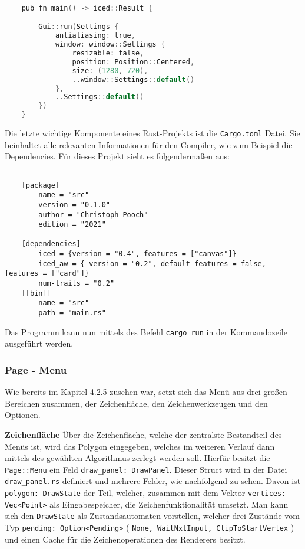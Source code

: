 \begin{lstlisting}[language=C]
  
    pub fn main() -> iced::Result {

        Gui::run(Settings {
            antialiasing: true,
            window: window::Settings {
                resizable: false,
                position: Position::Centered,
                size: (1280, 720),
                ..window::Settings::default()
            },
            ..Settings::default()
        })
    }

\end{lstlisting}

Die letzte wichtige Komponente eines Rust-Projekts ist die \lstinline{Cargo.toml} Datei. Sie beinhaltet alle relevanten Informationen für den Compiler, wie zum Beispiel die 
Dependencies. Für dieses Projekt sieht es folgendermaßen aus:

\begin{lstlisting}
  
    [package]
        name = "src"
        version = "0.1.0"
        author = "Christoph Pooch"
        edition = "2021"

    [dependencies]
        iced = {version = "0.4", features = ["canvas"]}
        iced_aw = { version = "0.2", default-features = false, features = ["card"]}
        num-traits = "0.2"
    [[bin]]
        name = "src"
        path = "main.rs"

\end{lstlisting}

Das Programm kann nun mittels des Befehl \lstinline{cargo run} in der Kommandozeile ausgeführt werden.

\subsubsection{Page - Menu}
Wie bereits im Kapitel 4.2.5 zusehen war, setzt sich das Menü aus drei großen Bereichen zusammen, der Zeichenfläche, den Zeichenwerkzeugen und den Optionen. \linebreak

\textbf{Zeichenfläche}\linebreak
Über die Zeichenfläche, welche der zentralste Bestandteil des Menüs ist, wird das Polygon eingegeben, welches im weiteren Verlauf dann mittels des gewählten Algorithmus zerlegt werden soll.
Hierfür besitzt die \lstinline{Page::Menu} ein Feld \lstinline{draw_panel: DrawPanel}. Dieser Struct wird in der Datei \lstinline{draw_panel.rs} definiert und mehrere Felder, wie nachfolgend zu sehen. 
Davon ist \lstinline{polygon: DrawState} der Teil, welcher, zusammen mit dem Vektor \lstinline{vertices: Vec<Point>} als Eingabespeicher, die Zeichenfunktionalität umsetzt. Man kann sich den \lstinline{DrawState} als Zustandsautomaten 
vorstellen, welcher drei Zustände vom Typ \lstinline{pending: Option<Pending>} ( \lstinline{None, WaitNxtInput, ClipToStartVertex} ) und einen Cache für die Zeichenoperationen des Renderers besitzt. 

